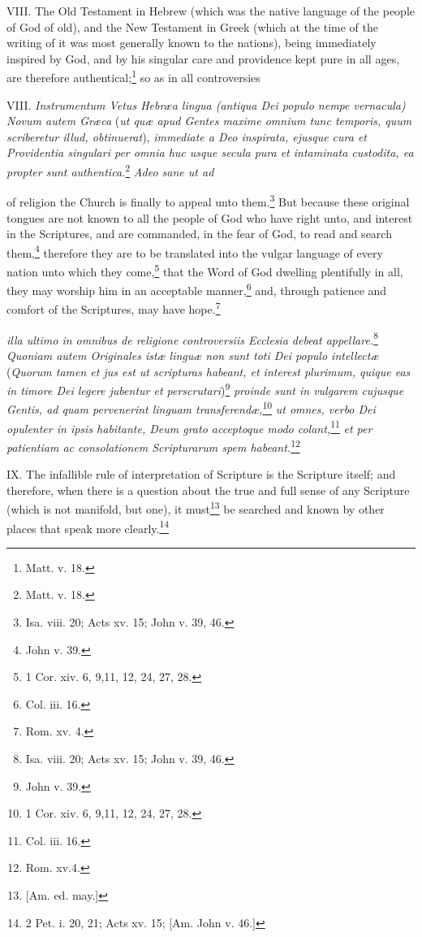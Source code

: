 VIII. The Old Testament in Hebrew (which was the native language of the people of God of old), and the New Testament in Greek (which at the time of the writing of it was most generally known to the nations), being immediately inspired by God, and by his singular care and providence kept pure in all ages, are therefore authentical;\footnote{Matt. v. 18.} so as in all controversies

VIII. \emph{Instrumentum Vetus Hebræa lingua (antiqua Dei populo nempe vernacula) Novum autem Græca} (\emph{ut quæ apud Gentes maxime omnium tunc temporis, quum scriberetur illud, obtinuerat}), \emph{immediate a Deo inspirata, ejusque cura et Providentia singulari per omnia huc usque secula pura et intaminata custodita, ea propter sunt authentica.}\footnote{Matt. v. 18.} \emph{Adeo sane ut ad }

of religion the Church is finally to appeal unto them.\footnote{Isa. viii. 20; Acts xv. 15;  John v. 39, 46.} But because these original tongues are not known to all the people of God who have right unto, and interest in the Scriptures, and are commanded, in the fear of God, to read and search them,\footnote{John v. 39.} therefore they are to be translated into the vulgar language of every nation unto which they come,\footnote{1 Cor. xiv. 6, 9,11, 12, 24, 27, 28.} that the Word of God dwelling plentifully in all, they may worship him in an acceptable manner,\footnote{Col. iii. 16.} and, through patience and comfort of the Scriptures, may have hope.\footnote{Rom. xv. 4.}

\emph{illa ultimo in omnibus de religione controversiis Ecclesia debeat appellare.}\footnote{Isa. viii. 20;  Acts xv. 15; John v. 39, 46.} \emph{Quoniam autem Originales istæ linguæ non sunt toti Dei populo intellectæ} (\emph{Quorum tamen et jus est ut scripturas habeant, et interest plurimum, quique eas in timore Dei legere jubentur et perscrutari})\footnote{John v. 39.}\emph{ proinde sunt in vulgarem cujusque Gentis, ad quam pervenerint linguam transferendæ,}\footnote{1 Cor. xiv. 6, 9,11, 12, 24, 27, 28.}\emph{ ut omnes, verbo Dei opulenter in ipsis habitante, Deum grato acceptoque modo colant,}\footnote{Col. iii. 16.}\emph{ et per patientiam ac consolationem Scripturarum spem habeant.}\footnote{Rom. xv.4.}

IX. The infallible rule of interpretation of Scripture is the Scripture itself; and therefore, when there is a question about the true and full sense of any Scripture (which is not manifold, but one), it must\footnote{[Am. ed. may.]} be searched and known by other places that speak more clearly.\footnote{2 Pet. i. 20, 21; Acts xv. 15; [Am. John v. 46.]}

